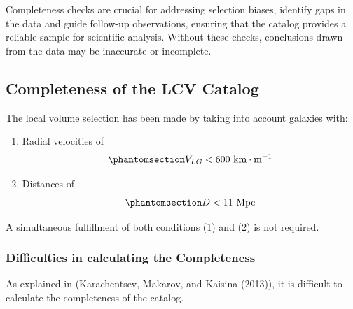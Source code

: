 \documentclass[
]{article}
\begin{document}
Completeness checks are crucial for addressing selection biases,
identify gaps in the data and guide follow-up observations, ensuring
that the catalog provides a reliable sample for scientific analysis.
Without these checks, conclusions drawn from the data may be inaccurate
or incomplete.

\subsection{Completeness of the LCV
Catalog}\label{completeness-of-the-lcv-catalog}

The local volume selection has been made by taking into account galaxies
with:

\begin{enumerate}
\def\labelenumi{\arabic{enumi}.}
\item
  Radial velocities of
  \begin{equation}\phantomsection\label{eq-lcv-vel}{
   V_{LG}<600 \text{ km}\cdot\text{m}^{-1}
  }\end{equation}
\item
  Distances of \begin{equation}\phantomsection\label{eq-lcv-dis}{
     D<11\ \text{Mpc}
     }\end{equation}
\end{enumerate}

A simultaneous fulfillment of both conditions (1) and (2) is not
required.

\subsubsection{Difficulties in calculating the
Completeness}\label{difficulties-in-calculating-the-completeness}

As explained in (Karachentsev, Makarov, and Kaisina (2013)), it is
difficult to calculate the completeness of the catalog.
\end{document}
